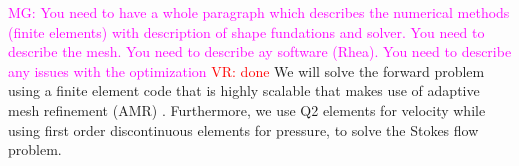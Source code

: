 \documentclass[12pt]{article}
\newcommand{\mgnote}[1]{\textcolor{magenta}{MG: #1}}
\newcommand{\vrnote}[1]{\textcolor{red}{VR: #1}}
\begin{document}

\mgnote{You need to have a whole paragraph which describes the numerical methods (finite elements) with description of shape fundations and solver. You need to describe the mesh. You need to describe ay software (Rhea). You need to describe any issues with the optimization} \vrnote{done}
We will solve the forward problem using a finite element code that is highly scalable that makes  use of adaptive mesh refinement (AMR) \citep{rudi2015extreme}. Furthermore, we use Q2 elements for velocity while using first order discontinuous elements for pressure, to solve the Stokes flow problem.
\end{document}
